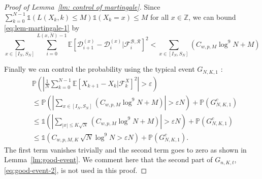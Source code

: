 \documentclass[EJP]{ejpecp} %
\begin{document}
\begin{proof}[Proof of Lemma~\ref{lm: control of martingale}]
	Since $\sum_{k = 0}^{N-1} \mathbb{1}\left( L(X_k, k) \le M \right) \mathbb{1}(X_k = x) \le  M$ for all $x \in \mathbb{Z}$, we can bound \eqref{eq:lem-martingale-1} by
	\begin{equation*}
		\sum_{x \in \left[ I_N, S_N \right]} \sum_{i = 0}^{L(x,N) - 1} \mathbb{E}\left[ \mathscr{D}_{i+1}^{(x)} - \mathscr{D}_i^{(x)} | \mathcal{F}_{i}^{\mathscr{B}, \mathscr{R}} \right]^2 
		< \sum_{x \in \left[ I_N, S_N \right]} (C_{w, p, M} \log^9 N +M )
	\end{equation*}
	
	Finally we can control the probability using the typical event $G_{N, K, 1}$ :
	\begin{align*}
		&\mathbb{P}\left( \left| \frac{1}{N} \sum_{k = 0}^{N-1} \mathbb{E}\left[ X_{k+1} - X_k | \mathcal{F}_k^X \right]^2  \right|  > \varepsilon \right)\\
		&\le \mathbb{P}\left( \left| \sum_{x \in \left[ I_N, S_N \right]} (C_{w, p, M} \log^9 N +M ) \right| > \varepsilon  N \right) + \mathbb{P}\left( G_{N, K, 1}^c \right)  \\
		&\le \mathbb{1}\left(  \left| \sum_{|x| \le K \sqrt{N} } (C_{w, p, M} \log^9 N +M ) \right| > \varepsilon  N  \right) + \mathbb{P}\left( G_{N, K, 1}^c \right)  \\
		&\le \mathbb{1}\left(  C_{w, p, M, K} \, \sqrt{N} \log^9 N > \varepsilon  N  \right) + \mathbb{P}\left( G_{N, K, 1}^c \right) 
		.\end{align*}
	The first term vanishes trivially and the second term goes to zero as shown in Lemma~\ref{lm:good-event}. 
	We comment here that the second part of $G_{n, K, t}$, \eqref{eq:good-event-2}, is not used in this proof.
\end{proof}
\end{document}
